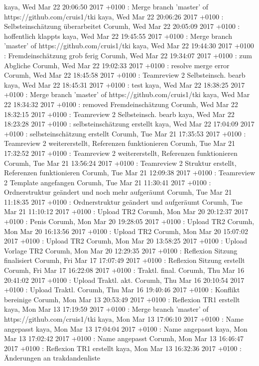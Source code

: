 kaya, Wed Mar 22 20:06:50 2017 +0100 : Merge branch 'master' of https://github.com/cruis1/tki
kaya, Wed Mar 22 20:06:26 2017 +0100 : Selbsteinschätzung überarbeitet
Corumh, Wed Mar 22 20:05:09 2017 +0100 : hoffentlich klappts
kaya, Wed Mar 22 19:45:55 2017 +0100 : Merge branch 'master' of https://github.com/cruis1/tki
kaya, Wed Mar 22 19:44:30 2017 +0100 : Fremdeinschätzung grob ferig
Corumh, Wed Mar 22 19:34:07 2017 +0100 : zum Abgliche
Corumh, Wed Mar 22 19:02:33 2017 +0100 : resolve merge error
Corumh, Wed Mar 22 18:45:58 2017 +0100 : Teamreview 2 Selbsteinsch. bearb
kaya, Wed Mar 22 18:45:31 2017 +0100 : test
kaya, Wed Mar 22 18:38:25 2017 +0100 : Merge branch 'master' of https://github.com/cruis1/tki
kaya, Wed Mar 22 18:34:32 2017 +0100 : removed Fremdeinschätzung
Corumh, Wed Mar 22 18:32:15 2017 +0100 : Teamreview 2 Selbsteinsch. bearb
kaya, Wed Mar 22 18:23:28 2017 +0100 : selbsteinschätzung erstellt
kaya, Wed Mar 22 17:04:09 2017 +0100 : selbsteinschätzung erstellt
Corumh, Tue Mar 21 17:35:53 2017 +0100 : Teamreview 2 weitererstellt, Referenzen funktionieren
Corumh, Tue Mar 21 17:32:52 2017 +0100 : Teamreview 2 weitererstellt, Referenzen funktionieren
Corumh, Tue Mar 21 13:56:24 2017 +0100 : Teamreview 2 Struktur erstellt, Referenzen funktionieren
Corumh, Tue Mar 21 12:09:38 2017 +0100 : Teamreview 2 Template angefangen
Corumh, Tue Mar 21 11:30:41 2017 +0100 : Ordnerstruktur geändert und noch mehr aufgeräumt
Corumh, Tue Mar 21 11:18:35 2017 +0100 : Ordnerstruktur geändert und aufgeräumt
Corumh, Tue Mar 21 11:10:12 2017 +0100 : Upload TR2
Corumh, Mon Mar 20 20:12:37 2017 +0100 : Penis
Corumh, Mon Mar 20 19:28:05 2017 +0100 : Upload TR2
Corumh, Mon Mar 20 16:13:56 2017 +0100 : Upload TR2
Corumh, Mon Mar 20 15:07:02 2017 +0100 : Upload TR2
Corumh, Mon Mar 20 13:58:25 2017 +0100 : Upload Vorlage TR2
Corumh, Mon Mar 20 12:29:35 2017 +0100 : Reflexion Sitzung finalisiert
Corumh, Fri Mar 17 17:07:49 2017 +0100 : Reflexion Sitzung erstellt
Corumh, Fri Mar 17 16:22:08 2017 +0100 : Traktl. final.
Corumh, Thu Mar 16 20:41:02 2017 +0100 : Upload Traktl. akt.
Corumh, Thu Mar 16 20:10:54 2017 +0100 : Upload Traktl.
Corumh, Thu Mar 16 19:40:46 2017 +0100 : Konflikt bereinige
Corumh, Mon Mar 13 20:53:49 2017 +0100 : Reflexion TR1 erstellt
kaya, Mon Mar 13 17:19:59 2017 +0100 : Merge branch 'master' of https://github.com/cruis1/tki
kaya, Mon Mar 13 17:06:10 2017 +0100 : Name angepasst
kaya, Mon Mar 13 17:04:04 2017 +0100 : Name angepasst
kaya, Mon Mar 13 17:02:42 2017 +0100 : Name angepasst
Corumh, Mon Mar 13 16:46:47 2017 +0100 : Reflexion TR1 erstellt
kaya, Mon Mar 13 16:32:36 2017 +0100 : Änderungen an trakdandenliste
